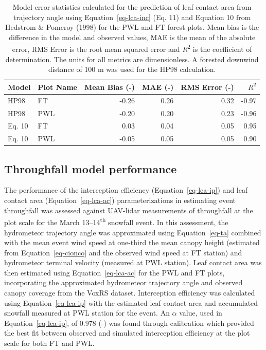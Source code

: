 \documentclass[
  letterpaper,
  DIV=11,
  numbers=noendperiod]{scrartcl}
\begin{document}
\begin{longtable}[]{@{}llrrrr@{}}

\caption{\label{tbl-lca-mod-err}Model error statistics calculated for
the prediction of leaf contact area from trajectory angle using
Equation~\ref{eq-lca-inc} (Eq. 11) and Equation 10 from Hedstrom \&
Pomeroy (1998) for the PWL and FT forest plots. Mean bias is the
difference in the model and observed values, MAE is the mean of the
absolute error, RMS Error is the root mean squared error and
\emph{R}\textsuperscript{2} is the coefficient of determination. The
units for all metrics are dimensionless. A forested downwind distance of
100 m was used for the HP98 calculation.}

\tabularnewline

\toprule\noalign{}
Model & Plot Name & Mean Bias (-) & MAE (-) & RMS Error (-) & \(R^2\) \\
\midrule\noalign{}
\endhead
\bottomrule\noalign{}
\endlastfoot
HP98 & FT & -0.26 & 0.26 & 0.32 & -0.97 \\
HP98 & PWL & -0.20 & 0.20 & 0.23 & -0.96 \\
Eq. 10 & FT & 0.03 & 0.04 & 0.05 & 0.95 \\
Eq. 10 & PWL & -0.05 & 0.05 & 0.05 & 0.90 \\

\end{longtable}

\subsection{Throughfall model
performance}\label{throughfall-model-performance}

The performance of the interception efficiency
(Equation~\ref{eq-lca-ip}) and leaf contact area
(Equation~\ref{eq-lca-ac}) parameterizations in estimating event
throughfall was assessed against UAV-lidar measurements of throughfall
at the plot scale for the March 13--14\textsuperscript{th} snowfall
event. In this assessment, the hydrometeor trajectory angle was
approximated using Equation~\ref{eq-ta} combined with the mean event
wind speed at one-third the mean canopy height (estimated from
Equation~\ref{eq-cionco} and the observed wind speed at FT station) and
hydrometeor terminal velocity (measured at PWL station). Leaf contact
area was then estimated using Equation~\ref{eq-lca-ac} for the PWL and
FT plots, incorporating the approximated hydrometeor trajectory angle
and observed canopy coverage from the VoxRS dataset. Interception
efficiency was calculated using Equation~\ref{eq-lca-ip} with the
estimated leaf contact area and accumulated snowfall measured at PWL
station for the event. An \(\alpha\) value, used in
Equation~\ref{eq-lca-ip}, of 0.978 (-) was found through calibration
which provided the best fit between observed and simulated interception
efficiency at the plot scale for both FT and PWL.
\end{document}
